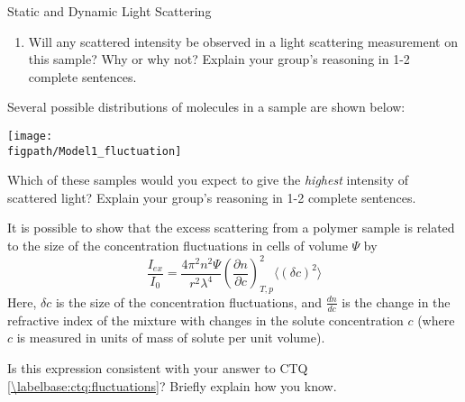 \begin{activity}{Static and Dynamic Light Scattering}
\begin{ctqs}
\begin{enumerate}
			\item Will any scattered intensity be observed in a light scattering measurement on this sample?  Why or why not?  Explain your group's reasoning in 1-2 complete sentences.
	
		\begin{solution}[1in]{}
		\end{solution}
			
		\end{enumerate}
		
	\question Several possible distributions of molecules in a sample are shown below: \label{\labelbase:ctq:fluctuations}
	
	\centerline{\texttt{[image: \\figpath/Model1\_fluctuation]}}
	
		Which of these samples would you expect to give the \emph{highest} intensity of scattered light?  Explain your group's reasoning in 1-2 complete sentences.
	
		\begin{solution}[1in]{}
		\end{solution}

\end{ctqs}

\begin{infobox}
	It is possible to show that the excess scattering from a polymer sample is related to the size of the concentration fluctuations in cells of volume $\Psi$ by
	\begin{equation*}
		\frac{I_{ex}}{I_0} = \frac{4 \pi^2 n^2 \Psi}{r^2 \lambda^4}\left(\frac{\partial n}{\partial c}\right)^2_{T,p} \langle ( \delta c )^2 \rangle
	\end{equation*}
	Here, $\delta c$ is the size of the concentration fluctuations, and $\frac{d n}{dc}$ is the change in the refractive index of the mixture with changes in the solute concentration $c$ (where $c$ is measured in units of mass of solute per unit volume).
\end{infobox}

\begin{ctqs}

	\question Is this expression consistent with your answer to CTQ \ref{\labelbase:ctq:fluctuations}?  Briefly explain how you know.
	
		\begin{solution}[1in]{}
		\end{solution}
	
\end{ctqs}


\end{activity}
